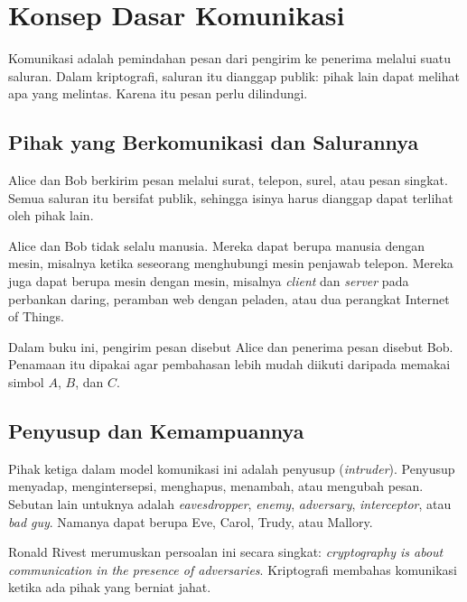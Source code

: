 \section{Konsep Dasar Komunikasi}
\label{sec:konsep-komunikasi}

Komunikasi adalah pemindahan pesan dari pengirim ke penerima melalui suatu
saluran. Dalam kriptografi, saluran itu dianggap publik: pihak lain dapat
melihat apa yang melintas. Karena itu pesan perlu dilindungi.

\subsection{Pihak yang Berkomunikasi dan Salurannya}

Alice dan Bob berkirim pesan melalui surat, telepon, surel, atau pesan
singkat. Semua saluran itu bersifat publik, sehingga isinya harus dianggap
dapat terlihat oleh pihak lain.

Alice dan Bob tidak selalu manusia. Mereka dapat berupa manusia dengan mesin,
misalnya ketika seseorang menghubungi mesin penjawab telepon. Mereka juga dapat
berupa mesin dengan mesin, misalnya \textit{client} dan \textit{server} pada
perbankan daring, peramban web dengan peladen, atau dua perangkat Internet of
Things.

Dalam buku ini, pengirim pesan disebut Alice dan penerima pesan disebut Bob.
Penamaan itu dipakai agar pembahasan lebih mudah diikuti daripada memakai
simbol $A$, $B$, dan $C$.

\subsection{Penyusup dan Kemampuannya}

Pihak ketiga dalam model komunikasi ini adalah penyusup (\textit{intruder}).
Penyusup menyadap, mengintersepsi, menghapus, menambah, atau mengubah pesan.
Sebutan lain untuknya adalah \textit{eavesdropper}, \textit{enemy},
\textit{adversary}, \textit{interceptor}, atau \textit{bad guy}. Namanya dapat
berupa Eve, Carol, Trudy, atau Mallory.

Ronald Rivest merumuskan persoalan ini secara singkat: \textit{cryptography is
about communication in the presence of adversaries}. Kriptografi membahas
komunikasi ketika ada pihak yang berniat jahat.

